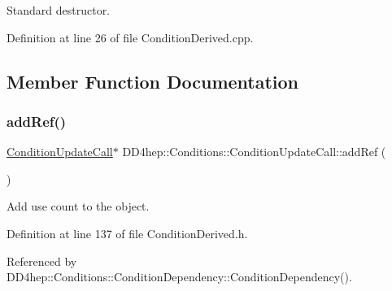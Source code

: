 Standard destructor. 



Definition at line 26 of file Condition\+Derived.\+cpp.



\subsection{Member Function Documentation}
\hypertarget{class_d_d4hep_1_1_conditions_1_1_condition_update_call_a6cba5a3773d6291e478b575d1083910f}{}\label{class_d_d4hep_1_1_conditions_1_1_condition_update_call_a6cba5a3773d6291e478b575d1083910f} 
\subsubsection{\texorpdfstring{add\+Ref()}{addRef()}}
{\footnotesize\ttfamily \hyperlink{class_d_d4hep_1_1_conditions_1_1_condition_update_call}{Condition\+Update\+Call}$\ast$ D\+D4hep\+::\+Conditions\+::\+Condition\+Update\+Call\+::add\+Ref (\begin{DoxyParamCaption}{ }\end{DoxyParamCaption})\hspace{0.3cm}{\ttfamily [inline]}}



Add use count to the object. 



Definition at line 137 of file Condition\+Derived.\+h.



Referenced by D\+D4hep\+::\+Conditions\+::\+Condition\+Dependency\+::\+Condition\+Dependency().

\hypertarget{class_d_d4hep_1_1_conditions_1_1_condition_update_call_adc561aca8c6bf851e0ee53f719b26a44}{}\label{class_d_d4hep_1_1_conditions_1_1_condition_update_call_adc561aca8c6bf851e0ee53f719b26a44} 
